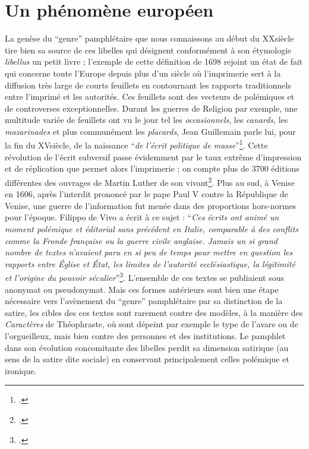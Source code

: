 \section{Un phénomène européen}
La genèse du \enquote{genre} pamphlétaire que nous connaissons au début du XX\ieme siècle tire bien sa source de ces libelles qui désignent conformément à son étymologie \textit{libellus} un petit livre ; l'exemple de cette définition de 1698 rejoint un état de fait qui concerne toute l'Europe depuis plus d'un siècle où l'imprimerie sert à la diffusion très large de courts feuillets en contournant les rapports traditionnels entre l'imprimé et les autorités. Ces feuillets sont des vecteurs de polémiques et de controverses exceptionnelles. Durant les guerres de Religion par exemple, une multitude variée de feuillets ont vu le jour tel les \textit{occasionnels}, les \textit{canards}, les \textit{mazarinades} et plus communément les \textit{placards}, Jean Guillemain parle lui, pour la fin du XV\ieme siècle, de la naissance \enquote{\textit{de l'écrit politique de masse}}\footcites{guillemain_livre_nodate}. Cette révolution de l'écrit subversif passe évidemment par le taux extrême d'impression et de réplication que permet alors l'imprimerie ; on compte plus de 3700 éditions différentes des ouvrages de Martin Luther de son vivant\footcites{guillemain_livre_nodate}. Plus au sud, à Venise en 1606, après l'interdit prononcé par le pape Paul V contre la République de Venise, une guerre de l'information fut menée dans des proportions hors-normes pour l'époque. Filippo de Vivo a écrit à ce sujet : \enquote{\textit{Ces écrits ont animé un moment polémique et éditorial sans précédent en Italie, comparable à des conflits comme la Fronde française ou la guerre civile anglaise. Jamais un si grand nombre de textes n'avaient paru en si peu de temps pour mettre en question les rapports entre Église et État, les limites de l'autorité ecclésiastique, la légitimité et l'origine du pouvoir séculier}}\footcites{vivo_chapitre_2016}. 
L'ensemble de ces textes se publiaient sous anonymat ou pseudonymat. Mais ces formes antérieurs sont bien une étape nécessaire vers l'avènement du \enquote{genre} pamphlétaire par sa distinction de la satire, les cibles des ces textes sont rarement contre des modèles, à la manière des \textit{Caractères} de Théophraste, où sont dépeint par exemple le type de l'avare ou de l'orgueilleux, mais bien contre des personnes et des institutions. Le pamphlet dans son évolution concomitante des libelles perdit sa dimension satirique (au sens de la satire dite sociale) en conservant principalement celles polémique et ironique.

